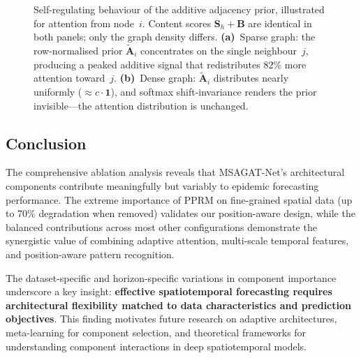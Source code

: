 \documentclass[11pt,a4paper]{article}
\begin{document}
\begin{figure}[t]
\caption{Self-regulating behaviour of the additive adjacency prior, illustrated for attention from node~$i$. Content scores $\mathbf{S}_h\!+\!\mathbf{B}$ are identical in both panels; only the graph density differs. \textbf{(a)}~Sparse graph: the row-normalised prior $\tilde{\mathbf{A}}_i$ concentrates on the single neighbour~$j$, producing a peaked additive signal that redistributes $82\%$ more attention toward~$j$. \textbf{(b)}~Dense graph: $\tilde{\mathbf{A}}_i$ distributes nearly uniformly ($\approx c\cdot\mathbf{1}$), and softmax shift-invariance renders the prior invisible---the attention distribution is unchanged.}
\label{fig:self_regulating}
\end{figure}
\subsection{Conclusion}

The comprehensive ablation analysis reveals that MSAGAT-Net's architectural components contribute meaningfully but variably to epidemic forecasting performance. The extreme importance of PPRM on fine-grained spatial data (up to 70\% degradation when removed) validates our position-aware design, while the balanced contributions across most other configurations demonstrate the synergistic value of combining adaptive attention, multi-scale temporal features, and position-aware pattern recognition.

The dataset-specific and horizon-specific variations in component importance underscore a key insight: \textbf{effective spatiotemporal forecasting requires architectural flexibility matched to data characteristics and prediction objectives}. This finding motivates future research on adaptive architectures, meta-learning for component selection, and theoretical frameworks for understanding component interactions in deep spatiotemporal models.
\end{document}
